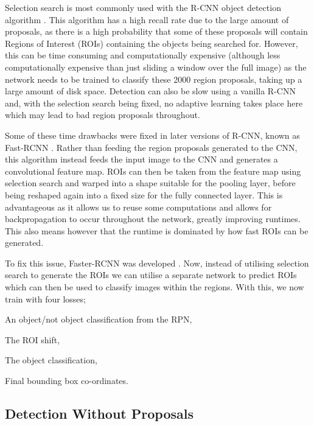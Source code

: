 Selection search is most commonly used with the R-CNN object detection algorithm \cite{girshick_rich_2014}. This algorithm has a high recall rate due to the large amount of proposals, as there is a high probability that some of these proposals will contain Regions of Interest (ROIs) containing the objects being searched for. However, this can be time consuming and computationally expensive (although less computationally expensive than just sliding a window over the full image) as the network needs to be trained to classify these 2000 region proposals, taking up a large amount of disk space. Detection can also be slow using a vanilla R-CNN and, with the selection search being fixed, no adaptive learning takes place here which may lead to bad region proposals throughout. 

Some of these time drawbacks were fixed in later versions of R-CNN, known as Fast-RCNN \cite{girshick_fast_2015}. Rather than feeding the region proposals generated to the CNN, this algorithm instead feeds the input image to the CNN and generates a convolutional feature map. ROIs can then be taken from the feature map using selection search and warped into a shape suitable for the pooling layer, before being reshaped again into a fixed size for the fully connected layer. This is advantageous as it allows us to reuse some computations and allows for backpropagation to occur throughout the network, greatly improving runtimes.  This also means however that the runtime is dominated by how fast ROIs can be generated. 

To fix this issue, Faster-RCNN was developed \cite{ren_faster_2015}. Now, instead of utilising selection search to generate the ROIs we can utilise a separate network to predict ROIs which can then be used to classify images within the regions. With this, we now train with four losses; 
\begin{enumerate*}
	\item An object/not object classification from the RPN,
	\item The ROI shift,
	\item The object classification,
	\item Final bounding box co-ordinates.
\end{enumerate*}

\subsection{Detection Without Proposals}\label{ch:Background,sec:objectDetection,sub:noProposals}

